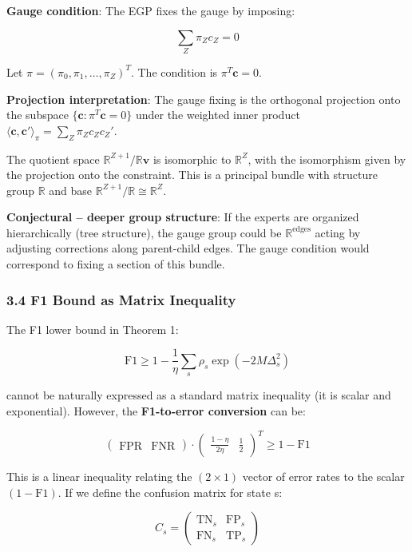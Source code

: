 \documentclass[
  12pt,
]{article}
\begin{document}
\textbf{Gauge condition}: The EGP fixes the gauge by imposing:

\[\sum_{Z} \pi_Z c_Z = 0\]

Let \(\pi = (\pi_0, \pi_1, \dots, \pi_Z)^T\). The condition is
\(\pi^T \mathbf{c} = 0\).

\textbf{Projection interpretation}: The gauge fixing is the orthogonal
projection onto the subspace \(\{\mathbf{c}: \pi^T \mathbf{c} = 0\}\)
under the weighted inner product
\(\langle \mathbf{c}, \mathbf{c}' \rangle_\pi = \sum_Z \pi_Z c_Z c_Z'\).

The quotient space \(\mathbb{R}^{Z+1} / \mathbb{R}\mathbf{v}\) is
isomorphic to \(\mathbb{R}^Z\), with the isomorphism given by the
projection onto the constraint. This is a principal bundle with
structure group \(\mathbb{R}\) and base
\(\mathbb{R}^{Z+1}/\mathbb{R} \cong \mathbb{R}^Z\).

\textbf{Conjectural -- deeper group structure}: If the experts are
organized hierarchically (tree structure), the gauge group could be
\(\mathbb{R}^{\text{edges}}\) acting by adjusting corrections along
parent-child edges. The gauge condition would correspond to fixing a
section of this bundle.

\subsubsection{3.4 F1 Bound as Matrix
Inequality}\label{f1-bound-as-matrix-inequality}

The F1 lower bound in Theorem 1:

\[\text{F1} \geq 1 - \frac{1}{\eta}\sum_s \rho_s \exp(-2M\Delta_s^2)\]

cannot be naturally expressed as a standard matrix inequality (it is
scalar and exponential). However, the \textbf{F1-to-error conversion}
can be:

\[\begin{pmatrix} \text{FPR} & \text{FNR} \end{pmatrix} \cdot \begin{pmatrix} \frac{1-\eta}{2\eta} & \frac{1}{2} \end{pmatrix}^T \geq 1 - \text{F1}\]

This is a linear inequality relating the \((2 \times 1)\) vector of
error rates to the scalar \((1 - \text{F1})\). If we define the
confusion matrix for state s:

\[C_s = \begin{pmatrix} \text{TN}_s & \text{FP}_s \\ \text{FN}_s & \text{TP}_s \end{pmatrix}\]
\end{document}
